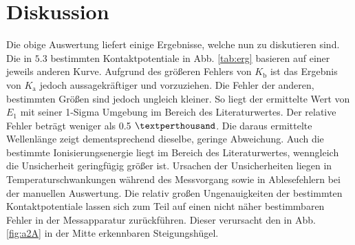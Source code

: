 
\section{Diskussion}
\label{sec:Diskussion}
Die obige Auswertung liefert einige Ergebnisse, welche nun zu diskutieren sind.
 Die in $5.3$ bestimmten Kontaktpotentiale in Abb. \ref{tab:erg} basieren auf einer
jeweils anderen Kurve. Aufgrund des größeren Fehlers von $K_\text{b}$ ist das
Ergebnis von $K_\text{a}$ jedoch aussagekräftiger und vorzuziehen. Die Fehler der anderen, bestimmten
Größen sind jedoch ungleich kleiner.
So liegt der ermittelte Wert von $E_1$ mit seiner 1-Sigma Umgebung im
Bereich des Literaturwertes. Der relative Fehler beträgt weniger als 0.5 $\textperthousand$.
Die daraus ermittelte Wellenlänge zeigt dementsprechend dieselbe, geringe Abweichung. Auch die
 bestimmte Ionisierungsenergie liegt im Bereich des Literaturwertes, wenngleich die Unsicherheit geringfügig größer ist.
Ursachen der Unsicherheiten liegen in Temperaturschwankungen während des
Messvorgang sowie in Ablesefehlern bei der manuellen Auswertung. Die relativ
großen Ungenauigkeiten der bestimmten Kontaktpotentiale lassen sich zum Teil auf einen nicht näher bestimmbaren Fehler
in der Messapparatur zurückführen. Dieser verursacht den in Abb. \ref{fig:a2A}
in der Mitte erkennbaren Steigungshügel.
